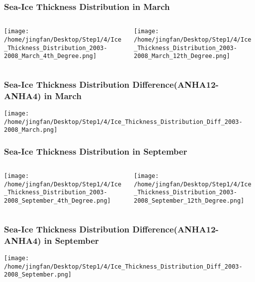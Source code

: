 \documentclass{beamer}
\begin{document}
\begin{frame}
\frametitle{Sea-Ice Thickness Distribution in March}

\begin{columns}
\begin{column}[t]{0.5\linewidth}
\centering
\texttt{[image: /home/jingfan/Desktop/Step1/4/Ice\_Thickness\_Distribution\_2003-2008\_March\_4th\_Degree.png]}
\end{column}
\begin{column}[t]{0.5\linewidth}
\centering
\texttt{[image: /home/jingfan/Desktop/Step1/4/Ice\_Thickness\_Distribution\_2003-2008\_March\_12th\_Degree.png]}
\end{column}
\end{columns}

\end{frame}

\begin{frame}
\frametitle{Sea-Ice Thickness Distribution Difference(ANHA12-ANHA4) in March}

\texttt{[image: /home/jingfan/Desktop/Step1/4/Ice\_Thickness\_Distribution\_Diff\_2003-2008\_March.png]}

\end{frame}

\begin{frame}
\frametitle{Sea-Ice Thickness Distribution in September}

\begin{columns}
\begin{column}[t]{0.5\linewidth}
\centering
\texttt{[image: /home/jingfan/Desktop/Step1/4/Ice\_Thickness\_Distribution\_2003-2008\_September\_4th\_Degree.png]}
\end{column}
\begin{column}[t]{0.5\linewidth}
\centering
\texttt{[image: /home/jingfan/Desktop/Step1/4/Ice\_Thickness\_Distribution\_2003-2008\_September\_12th\_Degree.png]}
\end{column}
\end{columns}

\end{frame}

\begin{frame}
\frametitle{Sea-Ice Thickness Distribution Difference(ANHA12-ANHA4) in September}

\texttt{[image: /home/jingfan/Desktop/Step1/4/Ice\_Thickness\_Distribution\_Diff\_2003-2008\_September.png]}

\end{frame}
\end{document}
